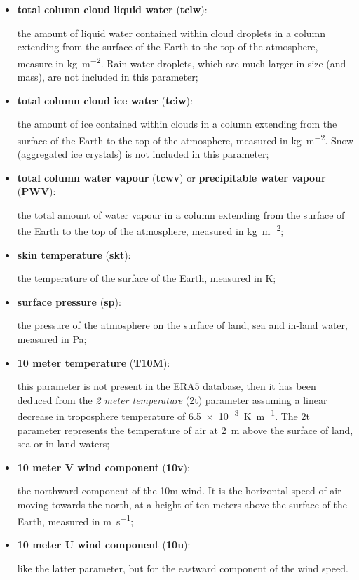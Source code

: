 \begin{itemize}
        \item \textbf{total column cloud liquid water} (\textbf{tclw}):

        the amount of liquid water contained within cloud
        droplets in a column extending from the surface of the Earth to the
        top of the atmosphere, measure in \si{\kilo\gram\per\square\meter}.
        Rain water droplets, which are much larger
        in size (and mass), are not included in this parameter;

        \item \textbf{total column cloud ice water} (\textbf{tciw}):

        the amount of ice contained within clouds in a column extending
        from the surface of the Earth to the top of the atmosphere,
        measured in \si{\kilo\gram\per\square\meter}. Snow
        (aggregated ice crystals) is not included in this parameter;

        \item \textbf{total column water vapour} (\textbf{tcwv}) or \textbf{precipitable
        water vapour} (\textbf{PWV}):

        the total amount of water vapour in a column
        extending from the surface of the Earth to the top of the
        atmosphere, measured in \si{\kilo\gram\per\square\meter};

        \item \textbf{skin temperature} (\textbf{skt}):

        the temperature of the surface of the Earth, measured in
        \si{\kelvin};

        \item \textbf{surface pressure} (\textbf{sp}):

        the pressure of the atmosphere on the surface of land, sea and
        in-land water, measured in \si{\pascal};

        \item \textbf{10 meter temperature} (\textbf{T10M}):

        this parameter is not present in the ERA5 database, then it has
        been deduced from the \emph{2 meter temperature} (2t) parameter
        assuming a linear decrease in troposphere temperature of
        \SI{6.5e-3}{\kelvin\per\meter}. The 2t parameter represents the
        temperature of air at \SI{2}{\meter} above the surface of land, sea
        or in-land waters;

        \item \textbf{10 meter V wind component} (\textbf{10v}):

        the northward component of the 10m wind. It is the horizontal speed
        of air moving towards the north, at a height of ten meters above
        the surface of the Earth, measured in \si{\meter\per\second};

        \item \textbf{10 meter U wind component} (\textbf{10u}):

        like the latter parameter, but for the eastward component of the
        wind speed.
\end{itemize}

